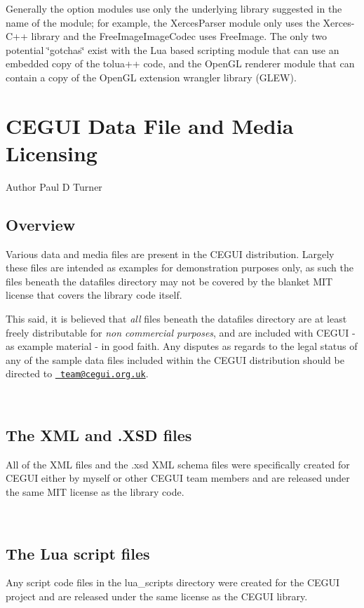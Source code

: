 Generally the option modules use only the underlying library suggested in the name of the module; for example, the Xerces\+Parser module only uses the Xerces-\/\+C++ library and the Free\+Image\+Image\+Codec uses Free\+Image. The only two potential \char`\"{}gotchas\char`\"{} exist with the Lua based scripting module that can use an embedded copy of the tolua++ code, and the Open\+GL renderer module that can contain a copy of the Open\+GL extension wrangler library (G\+L\+EW). \hypertarget{datafile_licensing}{}\section{C\+E\+G\+UI Data File and Media Licensing}\label{datafile_licensing}
\begin{DoxyAuthor}{Author}
Paul D Turner
\end{DoxyAuthor}
\hypertarget{datafile_licensing_data_lic_overview}{}\subsection{Overview}\label{datafile_licensing_data_lic_overview}
Various data and media files are present in the C\+E\+G\+UI distribution. Largely these files are intended as examples for demonstration purposes only, as such the files beneath the datafiles directory may not be covered by the blanket M\+IT license that covers the library code itself.

This said, it is believed that {\itshape all} files beneath the datafiles directory are at least freely distributable for {\itshape non commercial purposes}, and are included with C\+E\+G\+UI -\/ as example material -\/ in good faith. Any disputes as regards to the legal status of any of the sample data files included within the C\+E\+G\+UI distribution should be directed to \href{mailto:team@cegui.org.uk}{\texttt{ team@cegui.\+org.\+uk}}.

~\newline
 \hypertarget{datafile_licensing_data_lic_XML}{}\subsection{The X\+M\+L and .\+X\+S\+D files}\label{datafile_licensing_data_lic_XML}
All of the X\+ML files and the .xsd X\+ML schema files were specifically created for C\+E\+G\+UI either by myself or other C\+E\+G\+UI team members and are released under the same M\+IT license as the library code.

~\newline
 \hypertarget{datafile_licensing_data_lic_scripts}{}\subsection{The Lua script files}\label{datafile_licensing_data_lic_scripts}
Any script code files in the lua\+\_\+scripts directory were created for the C\+E\+G\+UI project and are released under the same license as the C\+E\+G\+UI library.

